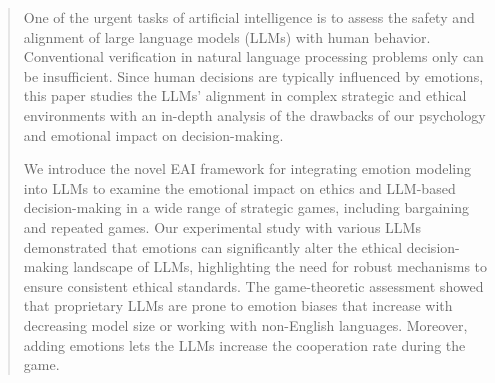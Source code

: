 \documentclass{article}
\begin{document}
\begin{abstract}
One of the urgent tasks of artificial intelligence is to assess the safety and alignment of large language models (LLMs) with human behavior. Conventional verification in natural language processing problems only can be insufficient. Since human decisions are typically influenced by emotions, this paper studies the LLMs' alignment in complex strategic and ethical environments with an in-depth analysis of the drawbacks of our psychology and emotional impact on decision-making. 

We introduce the novel EAI framework for integrating emotion modeling into LLMs to examine the emotional impact on ethics and LLM-based decision-making in a wide range of strategic games, including bargaining and repeated games. Our experimental study with various LLMs demonstrated that emotions can significantly alter the ethical decision-making landscape of LLMs, highlighting the need for robust mechanisms to ensure consistent ethical standards. The game-theoretic assessment showed that proprietary LLMs are prone to emotion biases that increase with decreasing model size or working with non-English languages. Moreover, adding emotions lets the LLMs increase the cooperation rate during the game. 








\end{abstract}
\end{document}
